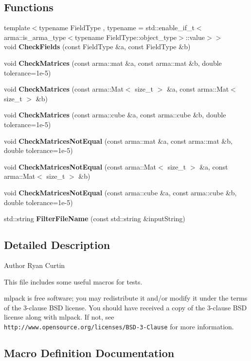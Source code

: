 \subsection*{Functions}
\begin{DoxyCompactItemize}
\item 
{\footnotesize template$<$typename Field\+Type , typename  = std\+::enable\+\_\+if\+\_\+t$<$              arma\+::is\+\_\+arma\+\_\+type$<$typename Field\+Type\+::object\+\_\+type$>$\+::value$>$$>$ }\\void \textbf{ Check\+Fields} (const Field\+Type \&a, const Field\+Type \&b)
\item 
void \textbf{ Check\+Matrices} (const arma\+::mat \&a, const arma\+::mat \&b, double tolerance=1e-\/5)
\item 
void \textbf{ Check\+Matrices} (const arma\+::\+Mat$<$ size\+\_\+t $>$ \&a, const arma\+::\+Mat$<$ size\+\_\+t $>$ \&b)
\item 
void \textbf{ Check\+Matrices} (const arma\+::cube \&a, const arma\+::cube \&b, double tolerance=1e-\/5)
\item 
void \textbf{ Check\+Matrices\+Not\+Equal} (const arma\+::mat \&a, const arma\+::mat \&b, double tolerance=1e-\/5)
\item 
void \textbf{ Check\+Matrices\+Not\+Equal} (const arma\+::\+Mat$<$ size\+\_\+t $>$ \&a, const arma\+::\+Mat$<$ size\+\_\+t $>$ \&b)
\item 
void \textbf{ Check\+Matrices\+Not\+Equal} (const arma\+::cube \&a, const arma\+::cube \&b, double tolerance=1e-\/5)
\item 
std\+::string \textbf{ Filter\+File\+Name} (const std\+::string \&input\+String)
\end{DoxyCompactItemize}


\subsection{Detailed Description}
\begin{DoxyAuthor}{Author}
Ryan Curtin
\end{DoxyAuthor}
This file includes some useful macros for tests.

mlpack is free software; you may redistribute it and/or modify it under the terms of the 3-\/clause B\+SD license. You should have received a copy of the 3-\/clause B\+SD license along with mlpack. If not, see {\tt http\+://www.\+opensource.\+org/licenses/\+B\+S\+D-\/3-\/\+Clause} for more information. 

\subsection{Macro Definition Documentation}
\mbox{\label{test__catch__tools_8hpp_aa02380f99fe064c7efddccac3ba7befb}} 
